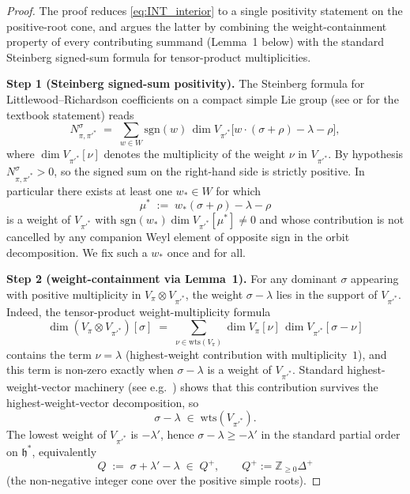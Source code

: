 \documentclass[11pt,a4paper]{article}
\theoremstyle{plain}
\theoremstyle{definition}
\newcommand{\sgn}{\mathrm{sgn}}
\begin{document}
\begin{proof}
The proof reduces \eqref{eq:INT_interior} to a single positivity
statement on the positive-root cone, and argues the latter by combining
the weight-containment property of every contributing summand (Lemma~1
below) with the standard Steinberg signed-sum formula for tensor-product
multiplicities.

\medskip
\textbf{Step 1 (Steinberg signed-sum positivity).} The Steinberg formula
for Littlewood--Richardson coefficients on a compact simple Lie group
(see \cite[Ch.~24 \S 4]{fulton_harris1991} or
\cite[Ch.~VIII \S 9]{bourbaki_lie_8} for the textbook statement) reads
\begin{equation}\label{eq:steinberg}
   N^\sigma_{\pi, \pi'^*}
   \;=\; \sum_{w \in W} \sgn(w)\, \dim V_{\pi'^*}\!\bigl[w \cdot
   (\sigma + \rho) - \lambda - \rho\bigr],
\end{equation}
where $\dim V_{\pi'^*}[\nu]$ denotes the multiplicity of the weight
$\nu$ in $V_{\pi'^*}$. By hypothesis $N^\sigma_{\pi, \pi'^*} > 0$, so
the signed sum on the right-hand side is strictly positive. In
particular there exists at least one $w_* \in W$ for which
\begin{equation}\label{eq:steinberg_witness}
   \mu^* \;:=\; w_*(\sigma + \rho) - \lambda - \rho
\end{equation}
is a weight of $V_{\pi'^*}$ with $\sgn(w_*) \dim V_{\pi'^*}[\mu^*] \ne 0$
and whose contribution is not cancelled by any companion Weyl element of
opposite sign in the orbit decomposition. We fix such a $w_*$ once and
for all.

\medskip
\textbf{Step 2 (weight-containment via Lemma~1).} For any dominant $\sigma$
appearing with positive multiplicity in $V_\pi \otimes V_{\pi'^*}$, the
weight $\sigma - \lambda$ lies in the support of $V_{\pi'^*}$. Indeed,
the tensor-product weight-multiplicity formula
\begin{equation*}
   \dim(V_\pi \otimes V_{\pi'^*})[\sigma]
   \;=\; \sum_{\nu \in \mathrm{wts}(V_\pi)} \dim V_\pi[\nu]\,
         \dim V_{\pi'^*}[\sigma - \nu]
\end{equation*}
contains the term $\nu = \lambda$ (highest-weight contribution with
multiplicity~$1$), and this term is non-zero exactly when
$\sigma - \lambda$ is a weight of $V_{\pi'^*}$. Standard
highest-weight-vector machinery (see e.g.\
\cite[Prop.~25.30]{fulton_harris1991}) shows that this contribution
survives the highest-weight-vector decomposition, so
\begin{equation}\label{eq:weight_containment}
   \sigma - \lambda \;\in\; \mathrm{wts}(V_{\pi'^*}).
\end{equation}
The lowest weight of $V_{\pi'^*}$ is $-\lambda'$, hence
$\sigma - \lambda \ge -\lambda'$ in the standard partial order on
$\mathfrak{h}^*$, equivalently
\begin{equation}\label{eq:Q_def}
   Q \;:=\; \sigma + \lambda' - \lambda \;\in\; Q^+,
   \qquad Q^+ := \mathbb Z_{\ge 0} \Delta^+
\end{equation}
(the non-negative integer cone over the positive simple roots).


\end{proof}
\end{document}
